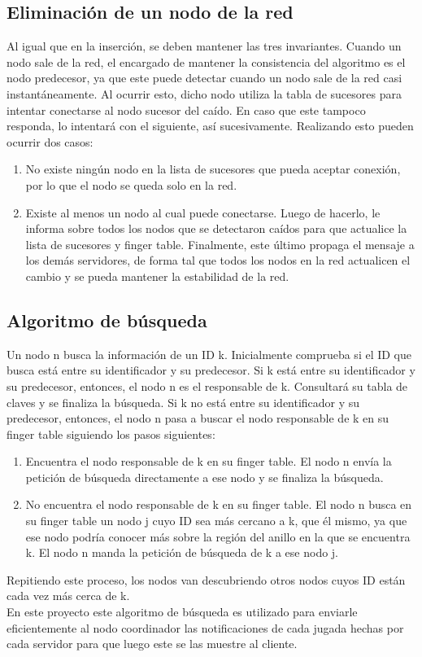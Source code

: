 \documentclass[10pt, a4paper]{article}
\begin{document}
    \subsection{Eliminaci\'on de un nodo de la red}
    Al igual que en la inserción, se deben mantener las tres invariantes. Cuando un nodo sale de la red, el encargado de mantener la consistencia del algoritmo es el nodo predecesor, ya que este puede detectar cuando un nodo sale de la red casi instantáneamente. Al ocurrir esto, dicho nodo utiliza la tabla de sucesores para intentar conectarse al nodo sucesor del caído. En caso que este tampoco responda, lo intentar\'a con el siguiente, así sucesivamente. Realizando esto pueden ocurrir dos casos:
    \begin{enumerate}
    	\item No existe ningún nodo en la lista de sucesores que pueda aceptar conexión, por lo que el nodo se queda solo en la red.
    	\item Existe al menos un nodo al cual puede conectarse. Luego de hacerlo, le informa sobre todos los nodos que se detectaron caídos para que actualice la lista de sucesores y finger table. Finalmente, este \'ultimo propaga el mensaje a los demás servidores, de forma tal que todos los nodos en la red actualicen el cambio y se pueda mantener la estabilidad de la red.\\
    \end{enumerate}
   
    \subsection{Algoritmo de búsqueda}
    Un nodo n busca la información de un ID k. Inicialmente comprueba si el ID que busca está entre su identificador y su predecesor. Si k está entre su identificador y su predecesor, entonces, el nodo n es el responsable de k. Consultar\'a su tabla de claves y se finaliza la búsqueda. Si k no está entre su identificador y su predecesor, entonces, el nodo n pasa a buscar el nodo responsable de k en su finger table siguiendo los pasos siguientes: 
    \begin{enumerate}
    	 \item Encuentra el nodo responsable de k en su finger table. El nodo n envía la petición de búsqueda directamente a ese nodo y se finaliza la búsqueda.
    	 \item No encuentra el nodo responsable de k en su finger table. El nodo n busca en su finger table un nodo j cuyo ID sea más cercano a k, que él mismo, ya que ese nodo podr\'ia conocer más sobre la región del anillo en la que se encuentra k. El nodo n manda la petición de búsqueda de k a ese nodo j.
    \end{enumerate} 
    Repitiendo este proceso, los nodos van descubriendo otros nodos cuyos ID están cada vez más cerca de k.\\
    En este proyecto este algoritmo de búsqueda es utilizado para enviarle eficientemente al nodo coordinador las notificaciones de cada jugada hechas por cada servidor para que luego este se las muestre al cliente. \\
    
\end{document}
